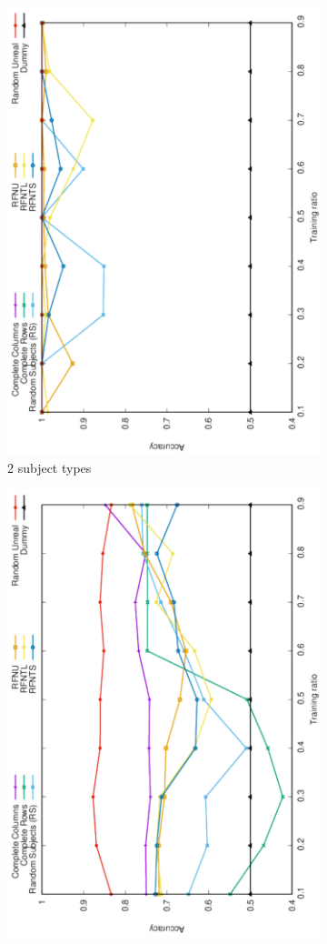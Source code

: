 \documentclass[10pt, conference, compsocconf]{IEEEtran}
\begin{document}
\begin{figure}
\begin{subfigure}[b]{0.4\linewidth}
        \includegraphics[width=0.8\columnwidth, angle=-90]{data/results/means_of_results/ALS-Bias/Synthetic/synthetic_subject_types/ALS-Bias-2-types.pdf}
        \caption{2 subject types}
\end{subfigure}
\begin{subfigure}[b]{0.4\linewidth}
        \includegraphics[width=0.8\columnwidth, angle=-90]{data/results/means_of_results/ALS-Bias/Synthetic/synthetic_subject_types/ALS-Bias-4-types.pdf}

\end{subfigure}
\end{figure}
\end{document}
